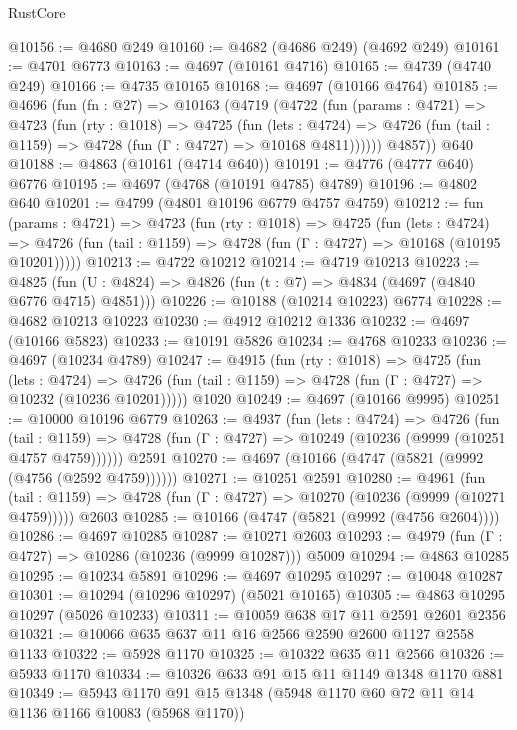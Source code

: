 \begin{lexlean}{RustCore}
\begin{coremodule}
@10156 := @4680 @249
@10160 := @4682 (@4686 @249) (@4692 @249)
@10161 := @4701 @6773
@10163 := @4697 (@10161 @4716)
@10165 := @4739 (@4740 @249)
@10166 := @4735 @10165
@10168 := @4697 (@10166 @4764)
@10185 := @4696
    (fun (fn : @27) =>
    @10163
      (@4719
        (@4722
          (fun (params : @4721) =>
          @4723
            (fun (rty : @1018) =>
            @4725
              (fun (lets : @4724) =>
              @4726 (fun (tail : @1159) => @4728 (fun (Γ : @4727) => @10168 @4811))))))
        @4857))
    @640
@10188 := @4863 (@10161 (@4714 @640))
@10191 := @4776 (@4777 @640) @6776
@10195 := @4697 (@4768 (@10191 @4785) @4789)
@10196 := @4802 @640
@10201 := @4799 (@4801 @10196 @6779 @4757 @4759)
@10212 := fun (params : @4721) =>
  @4723
    (fun (rty : @1018) =>
    @4725
      (fun (lets : @4724) =>
      @4726 (fun (tail : @1159) => @4728 (fun (Γ : @4727) => @10168 (@10195 @10201)))))
@10213 := @4722 @10212
@10214 := @4719 @10213
@10223 := @4825 (fun (U : @4824) => @4826 (fun (t : @7) => @4834 (@4697 (@4840 @6776 @4715) @4851)))
@10226 := @10188 (@10214 @10223) @6774
@10228 := @4682 @10213 @10223
@10230 := @4912 @10212 @1336
@10232 := @4697 (@10166 @5823)
@10233 := @10191 @5826
@10234 := @4768 @10233
@10236 := @4697 (@10234 @4789)
@10247 := @4915
    (fun (rty : @1018) =>
    @4725
      (fun (lets : @4724) =>
      @4726 (fun (tail : @1159) => @4728 (fun (Γ : @4727) => @10232 (@10236 @10201)))))
    @1020
@10249 := @4697 (@10166 @9995)
@10251 := @10000 @10196 @6779
@10263 := @4937
    (fun (lets : @4724) =>
    @4726
      (fun (tail : @1159) =>
      @4728 (fun (Γ : @4727) => @10249 (@10236 (@9999 (@10251 @4757 @4759))))))
    @2591
@10270 := @4697 (@10166 (@4747 (@5821 (@9992 (@4756 (@2592 @4759))))))
@10271 := @10251 @2591
@10280 := @4961
    (fun (tail : @1159) => @4728 (fun (Γ : @4727) => @10270 (@10236 (@9999 (@10271 @4759)))))
    @2603
@10285 := @10166 (@4747 (@5821 (@9992 (@4756 @2604))))
@10286 := @4697 @10285
@10287 := @10271 @2603
@10293 := @4979 (fun (Γ : @4727) => @10286 (@10236 (@9999 @10287))) @5009
@10294 := @4863 @10285
@10295 := @10234 @5891
@10296 := @4697 @10295
@10297 := @10048 @10287
@10301 := @10294 (@10296 @10297) (@5021 @10165)
@10305 := @4863 @10295 @10297 (@5026 @10233)
@10311 := @10059 @638 @17 @11 @2591 @2601 @2356
@10321 := @10066 @635 @637 @11 @16 @2566 @2590 @2600 @1127 @2558 @1133
@10322 := @5928 @1170
@10325 := @10322 @635 @11 @2566
@10326 := @5933 @1170
@10334 := @10326 @633 @91 @15 @11 @1149 @1348 @1170 @881
@10349 := @5943 @1170 @91 @15 @1348 (@5948 @1170 @60 @72 @11 @14 @1136 @1166 @10083 (@5968 @1170))

\end{coremodule}
\end{lexlean}
